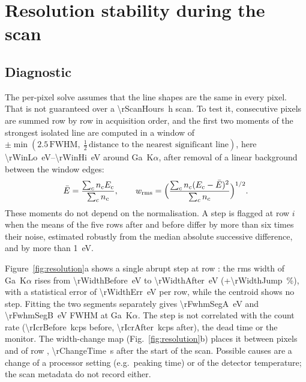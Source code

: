 \documentclass[11pt,a4paper]{article}
\begin{document}
\section{Resolution stability during the scan}\label{sec:resolution}
\subsection{Diagnostic}
The per-pixel solve assumes that the line shapes are the same in every pixel. That is not guaranteed
over a \qty{\rScanHours}{h} scan. To test it, consecutive pixels are summed row by row in
acquisition order, and the first two moments of the strongest isolated line are computed in a window of
$\pm\min(2.5\,\mathrm{FWHM},\ \tfrac12\,\text{distance to the nearest significant line})$, here
\qtyrange{\rWinLo}{\rWinHi}{eV} around Ga~K$\alpha$, after removal of a linear background between the
window edges:
\begin{equation}
\bar E = \frac{\sum_c n_c E_c}{\sum_c n_c},\qquad w_\mathrm{rms}=\Bigl(\frac{\sum_c n_c (E_c-\bar E)^2}{\sum_c n_c}\Bigr)^{1/2}.
\end{equation}
These moments do not depend on the normalisation. A step is flagged at row $i$ when the means of the
five rows after and before differ by more than six times their noise, estimated robustly from the
median absolute successive difference, and by more than \qty{1}{eV}.

Figure~\ref{fig:resolution}a shows a single abrupt step at row \rStepRow: the rms width of Ga~K$\alpha$
rises from \qty{\rWidthBefore}{eV} to \qty{\rWidthAfter}{eV} (\qty{+\rWidthJump}{\percent}), with a
statistical error of \qty{\rWidthErr}{eV} per row, while the centroid shows no step. Fitting the two
segments separately gives \qty{\rFwhmSegA}{eV} and \qty{\rFwhmSegB}{eV} FWHM at Ga~K$\alpha$. The step is
not correlated with the count rate (\qty{\rIcrBefore}{kcps} before, \qty{\rIcrAfter}{kcps} after), the dead
time or the monitor. The width-change map (Fig.~\ref{fig:resolution}b) places it between pixels
\rChangePixPrev{} and \rChangePix{} of row \rStepRow{}, \qty{\rChangeTime}{s} after the start of the scan.
Possible causes are a change of a processor setting (e.g.\ peaking time) or of the detector temperature; the scan metadata do not record either.
\end{document}
